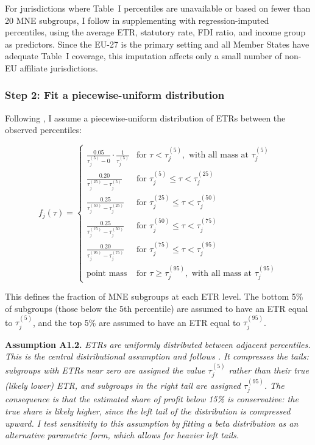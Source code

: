 \documentclass[11pt,a4paper]{article}
\newcommand{\assumption}[2]{\noindent\textbf{Assumption #1.} \textit{#2}\medskip}
\begin{document}
For jurisdictions where Table~I percentiles are unavailable or based on fewer than 20 MNE subgroups, I follow \citet{hugger2025} in supplementing with regression-imputed percentiles, using the average ETR, statutory rate, FDI ratio, and income group as predictors. Since the EU-27 is the primary setting and all Member States have adequate Table~I coverage, this imputation affects only a small number of non-EU affiliate jurisdictions.

\subsubsection{Step 2: Fit a piecewise-uniform distribution}

Following \citet{hugger2025}, I assume a piecewise-uniform distribution of ETRs between the observed percentiles:

\begin{equation}\label{eq:piecewise}
f_j(\tau) = \begin{cases}
\frac{0.05}{\tau_j^{(5)} - 0} \cdot \frac{1}{\tau_j^{(5)}} & \text{for } \tau < \tau_j^{(5)}, \text{ with all mass at } \tau_j^{(5)} \\[6pt]
\frac{0.20}{\tau_j^{(25)} - \tau_j^{(5)}} & \text{for } \tau_j^{(5)} \leq \tau < \tau_j^{(25)} \\[6pt]
\frac{0.25}{\tau_j^{(50)} - \tau_j^{(25)}} & \text{for } \tau_j^{(25)} \leq \tau < \tau_j^{(50)} \\[6pt]
\frac{0.25}{\tau_j^{(75)} - \tau_j^{(50)}} & \text{for } \tau_j^{(50)} \leq \tau < \tau_j^{(75)} \\[6pt]
\frac{0.20}{\tau_j^{(95)} - \tau_j^{(75)}} & \text{for } \tau_j^{(75)} \leq \tau < \tau_j^{(95)} \\[6pt]
\text{point mass} & \text{for } \tau \geq \tau_j^{(95)}, \text{ with all mass at } \tau_j^{(95)}
\end{cases}
\end{equation}

This defines the fraction of MNE subgroups at each ETR level. The bottom 5\% of subgroups (those below the 5th percentile) are assumed to have an ETR equal to $\tau_j^{(5)}$, and the top 5\% are assumed to have an ETR equal to $\tau_j^{(95)}$.

\assumption{A1.2}{ETRs are uniformly distributed between adjacent percentiles. This is the central distributional assumption and follows \citet{hugger2025}. It compresses the tails: subgroups with ETRs near zero are assigned the value $\tau_j^{(5)}$ rather than their true (likely lower) ETR, and subgroups in the right tail are assigned $\tau_j^{(95)}$. The consequence is that the estimated share of profit below 15\% is \emph{conservative}: the true share is likely higher, since the left tail of the distribution is compressed upward. I test sensitivity to this assumption by fitting a beta distribution as an alternative parametric form, which allows for heavier left tails.}
\end{document}
